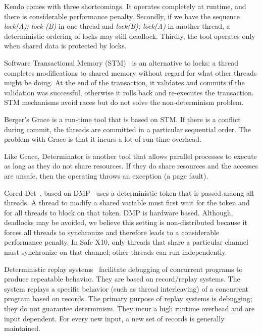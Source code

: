 Kendo comes with three shortcomings. It operates completely at runtime,
and there is considerable performance penalty. Secondly, if
we have the sequence \emph{lock(A); lock (B)} in one thread and
\emph{lock(B); lock(A)} in another thread, a deterministic ordering of
locks may still deadlock. Thirdly, the tool operates only when
shared data is protected by locks.

Software Transactional Memory (STM)~\cite{shavit1995software}
  is an alternative to locks: a thread completes modifications to
shared memory without regard for what other threads might be doing. At the end of the transaction,
it validates and commits if the validation was successful, otherwise it rolls back and re-executes
the transaction. STM mechanisms avoid races but do not solve the non-determinism problem.

Berger's Grace\cite{berger2009grace} is a run-time tool
that is based on STM.
If there is a conflict during commit, the threads are committed in
a particular sequential order.
The problem with Grace is that it incurs a lot of run-time
overhead.

Like Grace, Determinator\cite{aviram2010efficient} is another tool
that allows parallel processes to execute as long as they do not share
resources. If they do share resources and the accesses are unsafe, then
the operating throws an exception (a page fault).

Cored-Det~\cite{bergan2010coreDet}, based on DMP~\cite{devietti2009dmp}
uses a deterministic token that is passed
among all threads.  A thread to modify a shared variable must first
wait for the token and for all threads to block on that
token. DMP is hardware based.
Although, deadlocks may be avoided, we believe this setting is
non-distributed because it forces all threads to synchronize and
therefore leads to a considerable performance penalty. In Safe X10,
only threads that share a particular channel must synchronize
on that channel; other threads can run independently.

 Deterministic replay systems~\cite{choi1998deterministic,altekar2009odr} facilitate debugging of concurrent programs to produce
repeatable behavior. They are based on record/replay systems. The system
replays a specific behavior (such as thread interleaving) of a concurrent
program based on records. The primary purpose of replay systems
is debugging; they do not guarantee determinism.
They incur a high runtime overhead and are input dependent.
For every new input, a new set of records is generally maintained.

